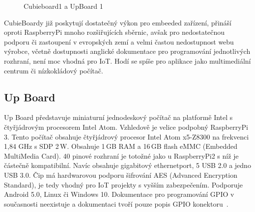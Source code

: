 	\begin{figure}[!ht]
    \centering
			\hspace*{5mm}
			\caption{Cubieboard1 a UpBoard 1}
\end{figure}
		

CubieBoardy již poskytují dostatečný výkon pro embeeded zařízení, přináší oproti RaspberryPi mnoho rozšiřujících sběrnic, avšak pro nedostatečnou podporu či zastoupení v evropských zemí a velmi častou nedostupnost webu výrobce, včetně dostupnosti anglické dokumentace pro  programování jednotlivých rozhraní, není moc vhodná pro IoT. Hodí se spíše pro aplikace jako multimediální centrum či nízkokládový počítač. 	


\subsection{Up Board}
		Up Board představuje miniaturní jednodeskový počítač na platformě Intel s čtyřjádrovým procesorem Intel Atom. Vzhledově je velice podpobný RaspberryPi 3. 
		Tento počítač obsahuje čtyřjádrový procesor Intel Atom x5-Z8300 na frekvenci 1,84 GHz s SDP 2\,W. Obsahuje 1\,GB RAM a 16\,GB flash eMMC (Embedded MultiMedia Card). 40 pinové rozhraní je totožné jako u RaspberryPi2 s níž je částečně kompatibilní. Navíc obsahuje gigabitový ethernetport, 5 USB 2.0 a jedno USB 3.0. Čip má hardwarovou podporu šifrování AES (Advanced Encryption Standard), je tedy vhodný pro IoT projekty s vyšším zabezpečením. Podporuje Android 5.0, Linux či Windows 10. Dokumentace pro programování GPIO v současnosti neexistuje a dokumentaci tvoří pouze popis GPIO konektoru~\cite{UpBoard}.

